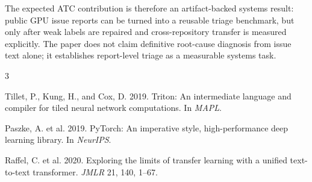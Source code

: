 \documentclass[sigplan,10pt]{acmart}
\begin{document}
The expected ATC contribution is therefore an artifact-backed systems result:
public GPU issue reports can be turned into a reusable triage benchmark, but
only after weak labels are repaired and cross-repository transfer is measured
explicitly. The paper does not claim definitive root-cause diagnosis from issue
text alone; it establishes report-level triage as a measurable systems task.


\begin{thebibliography}{3}

Tillet, P., Kung, H., and Cox, D. 2019. Triton: An intermediate language and
compiler for tiled neural network computations. In \emph{MAPL}.

Paszke, A. et al. 2019. PyTorch: An imperative style, high-performance deep
learning library. In \emph{NeurIPS}.

Raffel, C. et al. 2020. Exploring the limits of transfer learning with a
unified text-to-text transformer. \emph{JMLR} 21, 140, 1--67.

\end{thebibliography}
\end{document}
